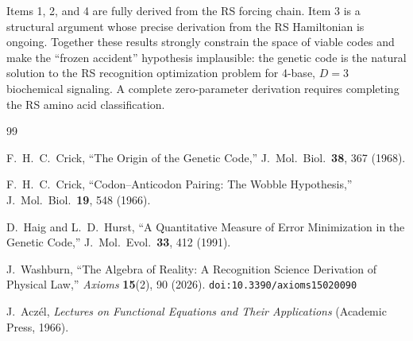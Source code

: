\documentclass[12pt,a4paper]{article}
\theoremstyle{definition}
\theoremstyle{remark}
\begin{document}
Items 1, 2, and 4 are fully derived from the RS forcing chain.
Item 3 is a structural argument whose precise derivation from the RS
Hamiltonian is ongoing.  Together these results strongly constrain the
space of viable codes and make the ``frozen accident'' hypothesis
implausible: the genetic code is the natural solution to the RS
recognition optimization problem for 4-base, $D = 3$ biochemical
signaling.  A complete zero-parameter derivation requires completing
the RS amino acid classification.

\begin{thebibliography}{99}

F.~H.~C.~Crick, ``The Origin of the Genetic Code,'' J.\ Mol.\
Biol.\ \textbf{38}, 367 (1968).

F.~H.~C.~Crick, ``Codon--Anticodon Pairing: The Wobble Hypothesis,''
J.\ Mol.\ Biol.\ \textbf{19}, 548 (1966).

D.~Haig and L.~D.~Hurst, ``A Quantitative Measure of Error
Minimization in the Genetic Code,'' J.\ Mol.\ Evol.\ \textbf{33},
412 (1991).

J.~Washburn, ``The Algebra of Reality: A Recognition Science Derivation
of Physical Law,'' \emph{Axioms} \textbf{15}(2), 90 (2026).
\texttt{doi:10.3390/axioms15020090}

J.~Acz\'el, \emph{Lectures on Functional Equations and Their
Applications} (Academic Press, 1966).

\end{thebibliography}
\end{document}
